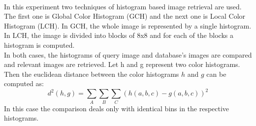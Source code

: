 \documentclass{report}
\begin{document}
\\
In this experiment two techniques of histogram based image retrieval are used. The first one is Global Color Histogram (GCH) and the next one is Local Color Histogram (LCH). In GCH, the whole image is represented by a single histogram. In LCH, the image is divided into blocks of 8x8 and for each of the blocks a histogram is computed.\\
In both cases, the histograms of query image and database’s images are compared and relevant images are retrieved. Let h and g represent two color histograms. Then the euclidean distance between the color histograms $h$ and $g$ can be computed as: 
\begin{equation}
d^2(h,g)=\sum_A\sum_B\sum_C(h(a,b,c)-g(a,b,c))^2\label{eq:7}
\end{equation}
In this case the comparison deals only with identical bins in the respective histograms.
\end{document}
